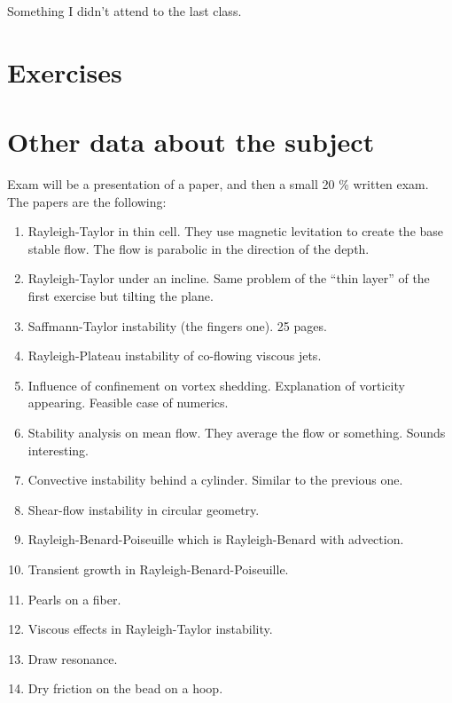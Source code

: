 \documentclass[palatino]{epflnotes}
\begin{document}
Something I didn't attend to the last class.

\appendix

\chapter{Exercises}


\chapter{Other data about the subject}

Exam will be a presentation of a paper, and then a small 20 \% written exam. The papers are the following:

\begin{enumerate}
	\item Rayleigh-Taylor in thin cell. They use magnetic levitation to create the base stable flow. The flow is parabolic in the direction of the depth.
	\item Rayleigh-Taylor under an incline. Same problem of the ``thin layer'' of the first exercise but tilting the plane.
	\item Saffmann-Taylor instability (the fingers one). 25 pages.
	\item Rayleigh-Plateau instability of co-flowing viscous jets.
	\item Influence of confinement on vortex shedding. Explanation of vorticity appearing. Feasible case of numerics.
	\item Stability analysis on mean flow. They average the flow or something. Sounds interesting.
	\item Convective instability behind a cylinder. Similar to the previous one.
	\item Shear-flow instability in circular geometry.
	\item Rayleigh-Benard-Poiseuille which is Rayleigh-Benard with advection.
	\item Transient growth in Rayleigh-Benard-Poiseuille.
	\item Pearls on a fiber.
	\item Viscous effects in Rayleigh-Taylor instability.
	\item Draw resonance.
	\item Dry friction on the bead on a hoop.
\end{enumerate}



\backmatter
\printindex
\end{document}
